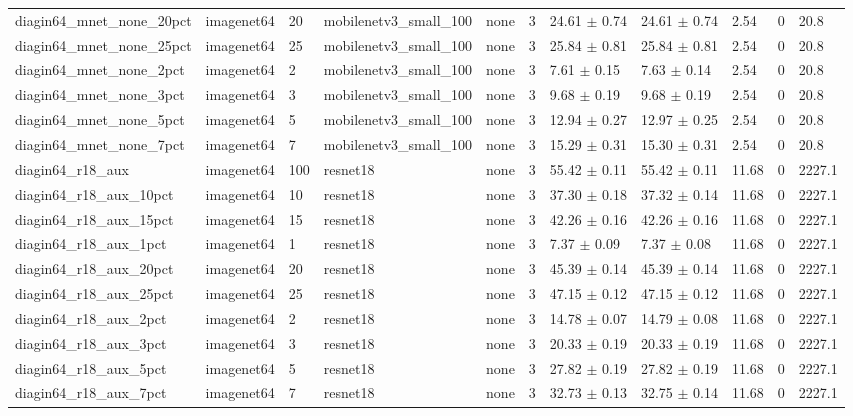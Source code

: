 \begin{tabular}{lllllllllll}
diagin64_mnet_none_20pct & imagenet64 & 20 & mobilenetv3_small_100 & none & 3 & 24.61 $\pm$ 0.74 & 24.61 $\pm$ 0.74 & 2.54 & 0 & 20.8 \\
diagin64_mnet_none_25pct & imagenet64 & 25 & mobilenetv3_small_100 & none & 3 & 25.84 $\pm$ 0.81 & 25.84 $\pm$ 0.81 & 2.54 & 0 & 20.8 \\
diagin64_mnet_none_2pct & imagenet64 & 2 & mobilenetv3_small_100 & none & 3 & 7.61 $\pm$ 0.15 & 7.63 $\pm$ 0.14 & 2.54 & 0 & 20.8 \\
diagin64_mnet_none_3pct & imagenet64 & 3 & mobilenetv3_small_100 & none & 3 & 9.68 $\pm$ 0.19 & 9.68 $\pm$ 0.19 & 2.54 & 0 & 20.8 \\
diagin64_mnet_none_5pct & imagenet64 & 5 & mobilenetv3_small_100 & none & 3 & 12.94 $\pm$ 0.27 & 12.97 $\pm$ 0.25 & 2.54 & 0 & 20.8 \\
diagin64_mnet_none_7pct & imagenet64 & 7 & mobilenetv3_small_100 & none & 3 & 15.29 $\pm$ 0.31 & 15.30 $\pm$ 0.31 & 2.54 & 0 & 20.8 \\
diagin64_r18_aux & imagenet64 & 100 & resnet18 & none & 3 & 55.42 $\pm$ 0.11 & 55.42 $\pm$ 0.11 & 11.68 & 0 & 2227.1 \\
diagin64_r18_aux_10pct & imagenet64 & 10 & resnet18 & none & 3 & 37.30 $\pm$ 0.18 & 37.32 $\pm$ 0.14 & 11.68 & 0 & 2227.1 \\
diagin64_r18_aux_15pct & imagenet64 & 15 & resnet18 & none & 3 & 42.26 $\pm$ 0.16 & 42.26 $\pm$ 0.16 & 11.68 & 0 & 2227.1 \\
diagin64_r18_aux_1pct & imagenet64 & 1 & resnet18 & none & 3 & 7.37 $\pm$ 0.09 & 7.37 $\pm$ 0.08 & 11.68 & 0 & 2227.1 \\
diagin64_r18_aux_20pct & imagenet64 & 20 & resnet18 & none & 3 & 45.39 $\pm$ 0.14 & 45.39 $\pm$ 0.14 & 11.68 & 0 & 2227.1 \\
diagin64_r18_aux_25pct & imagenet64 & 25 & resnet18 & none & 3 & 47.15 $\pm$ 0.12 & 47.15 $\pm$ 0.12 & 11.68 & 0 & 2227.1 \\
diagin64_r18_aux_2pct & imagenet64 & 2 & resnet18 & none & 3 & 14.78 $\pm$ 0.07 & 14.79 $\pm$ 0.08 & 11.68 & 0 & 2227.1 \\
diagin64_r18_aux_3pct & imagenet64 & 3 & resnet18 & none & 3 & 20.33 $\pm$ 0.19 & 20.33 $\pm$ 0.19 & 11.68 & 0 & 2227.1 \\
diagin64_r18_aux_5pct & imagenet64 & 5 & resnet18 & none & 3 & 27.82 $\pm$ 0.19 & 27.82 $\pm$ 0.19 & 11.68 & 0 & 2227.1 \\
diagin64_r18_aux_7pct & imagenet64 & 7 & resnet18 & none & 3 & 32.73 $\pm$ 0.13 & 32.75 $\pm$ 0.14 & 11.68 & 0 & 2227.1 \\

\end{tabular}
